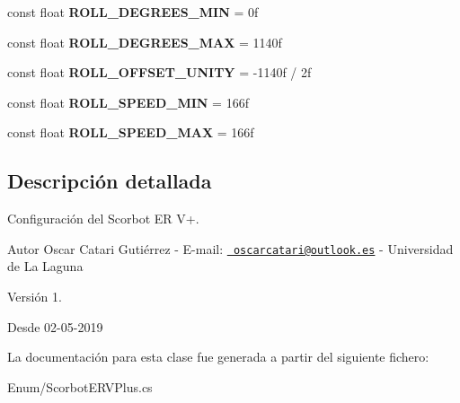 \begin{DoxyCompactItemize}
const float {\bfseries R\+O\+L\+L\+\_\+\+D\+E\+G\+R\+E\+E\+S\+\_\+\+M\+IN} = 0f
\item 
\mbox{\label{class_scorbot_e_r_v_plus_a98789ef1835295706a3e3f36d02210a0}} 
const float {\bfseries R\+O\+L\+L\+\_\+\+D\+E\+G\+R\+E\+E\+S\+\_\+\+M\+AX} = 1140f
\item 
\mbox{\label{class_scorbot_e_r_v_plus_afa2d3d2a05b3d973bd12da3ac2171835}} 
const float {\bfseries R\+O\+L\+L\+\_\+\+O\+F\+F\+S\+E\+T\+\_\+\+U\+N\+I\+TY} = -\/1140f / 2f
\item 
\mbox{\label{class_scorbot_e_r_v_plus_a4b1c28f7c0e51649f763b8a2cf6167dd}} 
const float {\bfseries R\+O\+L\+L\+\_\+\+S\+P\+E\+E\+D\+\_\+\+M\+IN} = 166f
\item 
\mbox{\label{class_scorbot_e_r_v_plus_a3f13b313829c31207c13a8111e20c851}} 
const float {\bfseries R\+O\+L\+L\+\_\+\+S\+P\+E\+E\+D\+\_\+\+M\+AX} = 166f
\end{DoxyCompactItemize}


\subsection{Descripción detallada}
Configuración del Scorbot ER V+. \begin{DoxyAuthor}{Autor}
Oscar Catari Gutiérrez -\/ E-\/mail\+: \href{mailto:oscarcatari@outlook.es}{\texttt{ oscarcatari@outlook.\+es}} -\/ Universidad de La Laguna 
\end{DoxyAuthor}
\begin{DoxyVersion}{Versión}
1. 
\end{DoxyVersion}
\begin{DoxySince}{Desde}
02-\/05-\/2019 
\end{DoxySince}


La documentación para esta clase fue generada a partir del siguiente fichero\+:\begin{DoxyCompactItemize}
\item 
Enum/Scorbot\+E\+R\+V\+Plus.\+cs\end{DoxyCompactItemize}

